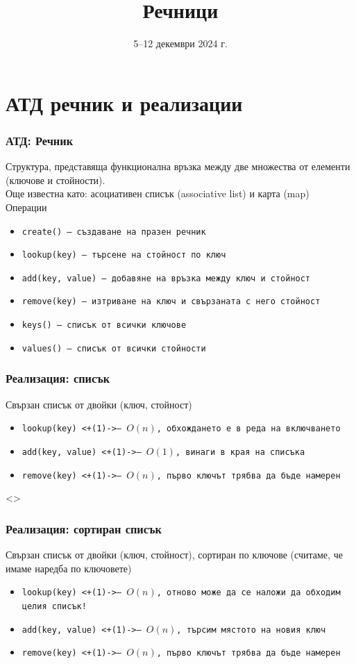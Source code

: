 \documentclass[alsotrans,beameroptions={aspectratio=169}]{beamerswitch}
\title{Речници}
\date{5--12 декември 2024 г.}
\begin{document}
\begin{frame}
  \titlepage
\end{frame}

\section{АТД речник и реализации}

\begin{frame}
  \frametitle{АТД: Речник}
  Структура, представяща функционална връзка между две множества от елементи (ключове и стойности).\\[2ex]
  \pause
  Още известна като: асоциативен списък (associative list) и карта (map)\\[2ex]
  \pause
  Операции
  \begin{itemize}
  \item \tt{create()} --- създаване на празен речник
  \item \tt{lookup(key)} --- търсене на стойност по ключ
  \item \tt{add(key, value)} --- добавяне на връзка между ключ и стойност
  \item \tt{remove(key)} --- изтриване на ключ и свързаната с него стойност
  \item \tt{keys()} --- списък от всички ключове
  \item \tt{values()} --- списък от всички стойности
  \end{itemize}
\end{frame}

\begin{frame}
  \frametitle{Реализация: списък}
  Свързан списък от двойки (ключ, стойност)
  \pause
  \begin{itemize}
  \item \tt{lookup(key)} \onslide<+(1)->{--- $O(n)$, обхождането е в реда на включването}
  \item \tt{add(key, value)} \onslide<+(1)->{--- $O(1)$, винаги в края на списъка}
  \item \tt{remove(key)} \onslide<+(1)->{--- $O(n)$, първо ключът трябва да бъде намерен}
  \end{itemize}
\end{frame}

\begin{frame}<>
  \frametitle{Реализация: сортиран списък}
  Свързан списък от двойки (ключ, стойност), сортиран по ключове (считаме, че имаме наредба по ключовете)
  \pause
  \begin{itemize}
  \item \tt{lookup(key)} \onslide<+(1)->{--- $O(n)$, отново може да се наложи да обходим целия списък!}
  \item \tt{add(key, value)} \onslide<+(1)->{--- \alert{$O(n)$}, търсим мястото на новия ключ}
  \item \tt{remove(key)} \onslide<+(1)->{--- $O(n)$, първо ключът трябва да бъде намерен}
  \end{itemize}
\end{frame}
\end{document}
